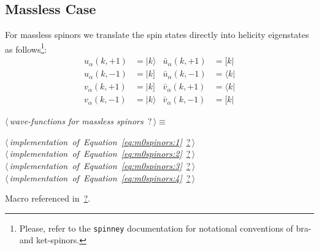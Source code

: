 \documentclass[a4paper,12pt]{amsart}
\newcommand{\bra}[1]{\langle #1 \vert}
\newcommand{\brb}[1]{[ #1 \vert}
\newcommand{\kea}[1]{\vert #1 \rangle}
\newcommand{\keb}[1]{\vert #1 ]}
\renewcommand{\NWtarget}[2]{\hypertarget{#1}{#2}}
\renewcommand{\NWlink}[2]{\hyperlink{#1}{#2}}
\renewcommand{\NWtxtMacroRefIn}{Macro referenced in}
\renewcommand{\NWsep}{${\diamond}$}
\begin{document}
\subsection{Massless Case}
For massless spinors we translate the spin states directly into
helicity eigenstates as follows\footnote{Please, refer to the
\texttt{spinney} documentation for notational conventions of
bra- and ket-spinors.}:
\begin{subequations}
\begin{align}
u_\alpha(k, +1) &= \kea{k} & \bar{u}_\alpha(k, +1) &= \brb{k}
\label{eq:m0spinors:1}\\
u_\alpha(k, -1) &= \keb{k} & \bar{u}_\alpha(k, -1) &= \bra{k}
\label{eq:m0spinors:2}\\
v_\alpha(k, +1) &= \keb{k} & \bar{v}_\alpha(k, +1) &= \bra{k}
\label{eq:m0spinors:3}\\
v_\alpha(k, -1) &= \kea{k} & \bar{v}_\alpha(k, -1) &= \brb{k}
\label{eq:m0spinors:4}
\end{align}
\end{subequations}
\begin{flushleft} \small
\begin{minipage}{\linewidth}\label{scrap8}\raggedright\small
\NWtarget{nuweb?}{} $\langle\,${\it wave-functions for massless spinors}\nobreak\ {\footnotesize {?}}$\,\rangle\equiv$
\vspace{-1ex}
\begin{list}{}{} \item
\mbox{}\verb@@\hbox{$\langle\,${\it implementation of Equation~\eqref{eq:m0spinors:1}}\nobreak\ {\footnotesize \NWlink{nuweb?}{?}}$\,\rangle$}\verb@@\\
\mbox{}\verb@@\hbox{$\langle\,${\it implementation of Equation~\eqref{eq:m0spinors:2}}\nobreak\ {\footnotesize \NWlink{nuweb?}{?}}$\,\rangle$}\verb@@\\
\mbox{}\verb@@\hbox{$\langle\,${\it implementation of Equation~\eqref{eq:m0spinors:3}}\nobreak\ {\footnotesize \NWlink{nuweb?}{?}}$\,\rangle$}\verb@@\\
\mbox{}\verb@@\hbox{$\langle\,${\it implementation of Equation~\eqref{eq:m0spinors:4}}\nobreak\ {\footnotesize \NWlink{nuweb?}{?}}$\,\rangle$}\verb@@{\NWsep}
\end{list}
\vspace{-1.5ex}
\footnotesize
\begin{list}{}{\setlength{\itemsep}{-\parsep}\setlength{\itemindent}{-\leftmargin}}
\item \NWtxtMacroRefIn\ \NWlink{nuweb?}{?}.

\item{}
\end{list}
\end{minipage}\vspace{4ex}
\end{flushleft}
\end{document}
